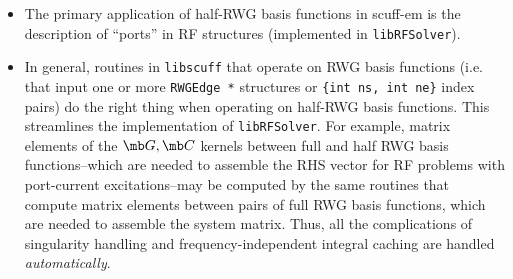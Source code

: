 \begin{itemize}
  \item The primary application of half-RWG basis functions
        in {\sc scuff-em} is the description of ``ports'' in RF structures
        (implemented in \texttt{libRFSolver}).

  \item In general, routines in \texttt{libscuff} that operate on
        RWG basis functions (i.e. that input one or more \texttt{RWGEdge *}
        structures or \texttt{\{int ns, int ne\}} index pairs) 
        do the right thing when operating on half-RWG basis functions.
        This streamlines the implementation of \texttt{libRFSolver}.
        For example, matrix elements of the $\mb G,\mb C$ kernels 
        between full and half RWG basis functions--which are needed to
        assemble the RHS vector for RF problems with port-current excitations--may
        be computed by the same routines that compute matrix elements 
        between pairs of full RWG basis functions, which are needed to
        assemble the system matrix. Thus, all the complications of singularity
        handling and frequency-independent integral caching are handled
        \textit{automatically}.
        
\end{itemize}

